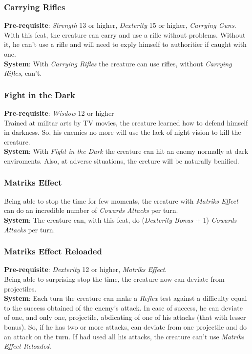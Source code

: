 \documentclass[ letterpaper,12pt]{article}
\begin{document}
\subsubsection{Carrying Rifles}
{\bf Pre-requisite}: {\it Strength} 13 or higher, {\it Dexterity} 15 or higher, {\it Carrying Guns}.\\
With this feat, the creature can carry and use a rifle without problems. Without it, he can't use a rifle and will need to exply himself to authoritier if caught with one.\\
{\bf System}: With {\it Carrying Rifles} the creature can use rifles, without {\it Carrying Rifles}, can't.

\subsubsection{Fight in the Dark}
{\bf Pre-requisite}: {\it Wisdow} 12 or higher\\
Trained at militar arts by TV movies, the creature learned how to defend himself in darkness. So, his enemies no more will use the lack of night vision to kill the creature.\\
{\bf System}: With {\it Fight in the Dark} the creature can hit an enemy normally at dark enviroments. Also, at adverse situations, the creture will be naturally benified.\\

\subsubsection{Matriks Effect}
Being able to stop the time for few moments, the creature with {\it Matriks Effect} can do an incredible number of {\it Cowards Attacks} per turn.\\
{\bf System}: The creature can, with this feat, do ({\it Dexterity Bonus} + 1) {\it Cowards Attacks} per turn.

\subsubsection{Matriks Effect Reloaded}
{\bf Pre-requisite}: {\it Dexterity} 12 or higher, {\it Matriks Effect}.\\
Being able to surprising stop the time, the creature now can deviate from projectiles.\\
{\bf System}: Each turn the creature can make a {\it Reflex} test against a difficulty equal to the success obtained of the enemy's attack. In case of success, he can deviate of one, and only one, projectile, abdicating of one of his attacks (that with lesser bonus). So, if he has two or more attacks, can deviate from one projectile and do an attack on the turn. If had used all his attacks, the creature can't use {\it Matriks Effect Reloaded}.
\end{document}
